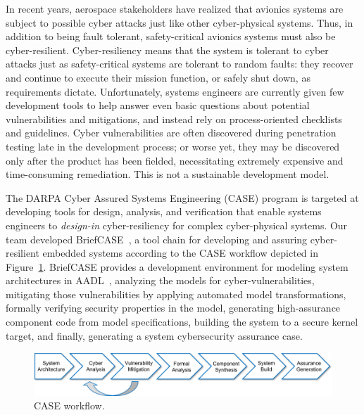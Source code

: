 


In recent years, aerospace stakeholders have realized that avionics systems are subject to possible cyber attacks just like other cyber-physical systems. Thus, in addition to being fault tolerant, safety-critical avionics systems must also be cyber-resilient. Cyber-resiliency means that the system is tolerant to cyber attacks just as safety-critical systems are tolerant to random faults: they recover and continue to execute their mission function, or safely shut down, as requirements dictate. Unfortunately, systems engineers are currently given few development tools to help answer even basic questions about potential vulnerabilities and mitigations, and instead rely on process-oriented checklists and guidelines. Cyber vulnerabilities are often discovered during penetration testing late in the development process; or worse yet, they may be discovered only after the product has been fielded, necessitating extremely expensive and time-consuming remediation. This is not a sustainable development model. 

The DARPA Cyber Assured Systems Engineering (CASE) program is targeted at developing tools for design, analysis, and verification that enable systems engineers to \textit{design-in} cyber-resiliency for complex cyber-physical systems. 
%
Our team developed BriefCASE~\cite{case-at-scale}, a tool chain for developing and assuring cyber-resilient embedded systems according to the CASE workflow depicted in Figure~\ref{fig:workflow}. BriefCASE provides a development environment for modeling system architectures in AADL~\cite{feiler-aadl}, analyzing the models for cyber-vulnerabilities, mitigating those vulnerabilities by applying automated model transformations, formally verifying security properties in the model, generating high-assurance component code from model specifications, building the system to a secure kernel target, and finally, generating a system cybersecurity assurance case.  

\begin{figure}[h] 
	\centering 
	\includegraphics[width=\textwidth]{figs/workflow.png}
	\caption{CASE workflow.}
	\label{fig:workflow} 
\end{figure}

